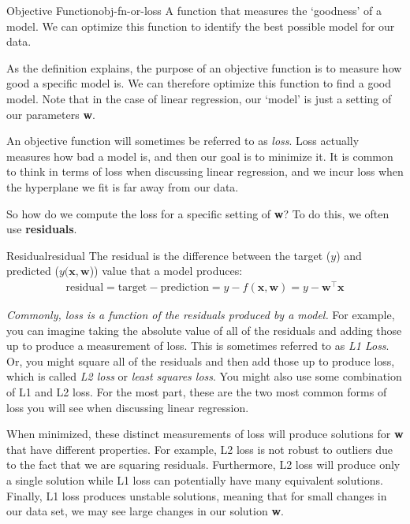 \begin{definition}{Objective Function}{obj-fn-or-loss}
A function that measures the `goodness' of a model. We can optimize this function to identify the best possible model for our data.
\end{definition}

As the definition explains, the purpose of an objective function is to measure how good a specific model is. We can therefore optimize this function to find a good model. Note that in the case of linear regression, our `model' is just a setting of our parameters \textbf{w}.

An objective function will sometimes be referred to as \textit{loss}. Loss actually measures how bad a model is, and then our goal is to minimize it. It is common to think in terms of loss when discussing linear regression, and we incur loss when the hyperplane we fit is far away from our data.

So how do we compute the loss for a specific setting of \textbf{w}? To do this, we often use \textbf{residuals}.

\begin{definition}{Residual}{residual}
The residual is the difference between the target ($y$) and predicted ($y(\textbf{x}, \textbf{w}$)) value that a model produces:
\begin{align*}
    \text{residual} = \text{target} - \text{prediction} = y - f(\textbf{x}, \textbf{w}) = \boxed{y - \textbf{w}^\top\textbf{x}}
\end{align*}
\end{definition}

\textit{Commonly, loss is a function of the residuals produced by a model.} For example, you can imagine taking the absolute value of all of the residuals and adding those up to produce a measurement of loss. This is sometimes referred to as \textit{L1 Loss}. Or, you might square all of the residuals and then add those up to produce loss, which is called \textit{L2 loss} or \textit{least squares loss}. You might also use some combination of L1 and L2 loss. For the most part, these are the two most common forms of loss you will see when discussing linear regression.

When minimized, these distinct measurements of loss will produce solutions for \textbf{w} that have different properties. For example, L2 loss is not robust to outliers due to the fact that we are squaring residuals. Furthermore, L2 loss will produce only a single solution while L1 loss can potentially have many equivalent solutions. Finally, L1 loss produces unstable solutions, meaning that for small changes in our data set, we may see large changes in our solution \textbf{w}.

